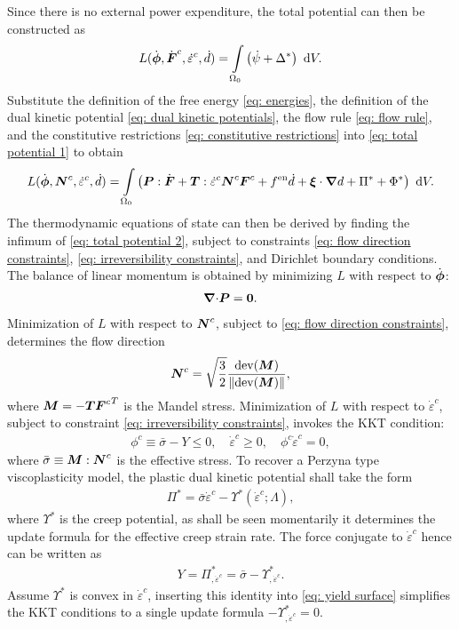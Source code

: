 Since there is no external power expenditure, the total potential can then be constructed as
\begin{align}
  L(\dot{\boldsymbol{\phi}}, \dot{\boldsymbol{F}}^c, \dot{\varepsilon}^c, \dot{d}) = \int\limits_{\Omega_0} \left( \dot{\psi} + \Delta^* \right) \text{ d}V. \label{eq: total potential 1}
\end{align}
Substitute the definition of the free energy \eqref{eq: energies}, the definition of the dual kinetic potential \eqref{eq: dual kinetic potentials}, the flow rule \eqref{eq: flow rule}, and the constitutive restrictions \eqref{eq: constitutive restrictions} into \eqref{eq: total potential 1} to obtain
\begin{align}
  L(\dot{\boldsymbol{\phi}}, \boldsymbol{N}^c, \dot{\varepsilon}^c, \dot{d}) = \int\limits_{\Omega_0} \left( \boldsymbol{P}:\dot{\boldsymbol{F}} + \boldsymbol{T}:\dot{\varepsilon}^c\boldsymbol{N}^c\boldsymbol{F}^c + f^\text{en}\dot{d} + \boldsymbol{\xi}\cdot\boldsymbol{\nabla} d + \Pi^* + \Phi^* \right) \text{ d}V. \label{eq: total potential 2}
\end{align}
The thermodynamic equations of state can then be derived by finding the infimum of \eqref{eq: total potential 2}, subject to constraints \eqref{eq: flow direction constraints}, \eqref{eq: irreversibility constraints}, and Dirichlet boundary conditions. The balance of linear momentum is obtained by minimizing $L$ with respect to $\dot{\boldsymbol{\phi}}$:
\begin{align}
  {\boldsymbol{\nabla}\cdot}\boldsymbol{P} = \boldsymbol{0}. \label{eq: linear momentum balance}
\end{align}
Minimization of $L$ with respect to $\boldsymbol{N}^c$, subject to \eqref{eq: flow direction constraints}, determines the flow direction
\begin{align}
  \boldsymbol{N}^c = \sqrt{\dfrac{3}{2}}\dfrac{\operatorname{dev}(\boldsymbol{M})}{\left\lVert\operatorname{dev}(\boldsymbol{M})\right\rVert}, \label{eq: flow direction}
\end{align}
where $\boldsymbol{M} = -\boldsymbol{T}{\boldsymbol{F}^c}^T$ is the Mandel stress. Minimization of $L$ with respect to $\dot{\varepsilon}^c$, subject to constraint \eqref{eq: irreversibility constraints}, invokes the KKT condition:
\begin{align}
  \phi^c \equiv \bar{\sigma} - Y \leqslant 0, \quad \dot{\varepsilon}^c \geqslant 0, \quad \phi^c\dot{\varepsilon}^c = 0, \label{eq: yield surface}
\end{align}
where $\bar{\sigma} \equiv \boldsymbol{M}:\boldsymbol{N}^c$ is the effective stress. To recover a Perzyna type viscoplasticity model, the plastic dual kinetic potential shall take the form
\begin{align}
  \Pi^* = \bar{\sigma}\dot{\varepsilon}^c - \Upsilon^*(\dot{\varepsilon}^c; \Lambda),
\end{align}
where $\Upsilon^*$ is the creep potential, as shall be seen momentarily it determines the update formula for the effective creep strain rate. The force conjugate to $\dot{\varepsilon}^c$ hence can be written as
\begin{align}
  Y = \Pi^*_{,\dot{\varepsilon}^c} = \bar{\sigma} - \Upsilon^*_{,\dot{\varepsilon}^c}.
\end{align}
Assume $\Upsilon^*$ is convex in $\dot{\varepsilon}^c$, inserting this identity into \eqref{eq: yield surface} simplifies the KKT conditions to a single update formula $-\Upsilon^*_{,\dot{\varepsilon}^c} = 0$.

